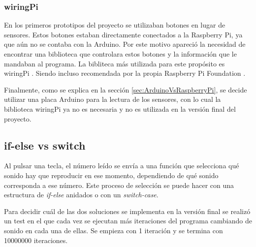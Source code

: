             \subsubsection{wiringPi} %
            \label{ssub:WiringPi}

                En los primeros prototipos del proyecto se utilizaban botones en lugar de sensores. Estos botones
                estaban directamente conectados a la Raspberry Pi, ya que aún no se contaba con la Arduino. Por este
                motivo apareció la necesidad de encontrar una biblioteca que controlara estos botones y la información
                que le mandaban al programa. La bibliteca más utilizada para este propósito es wiringPi \cite{wiringPi}.
                Siendo incluso recomendada por la propia Raspberry Pi Foundation \cite{wiringpi_raspberrypi_docu}.

                Finalmente, como se explica en la sección \ref{sec:ArduinoVsRaspberryPi}, se decide utilizar una placa
                Arduino para la lectura de los sensores, con lo cual la biblioteca wiringPi ya no es necesaria y no es
                utilizada en la versión final del proyecto.



        \subsection{if-else vs switch} %
        \label{sub:if-else_vs_switch}

            Al pulsar una tecla, el número leído se envía a una función que selecciona qué sonido hay que reproducir en
            ese momento, dependiendo de qué sonido corresponda a ese número. Este proceso de selección se puede hacer
            con una estructura de \textit{if-else} anidados o con un \textit{switch-case}.

            Para decidir cuál de las dos soluciones se implementa en la versión final se realizó un test en el que cada
            vez se ejecutan más iteraciones del programa cambiando de sonido en cada una de ellas. Se empieza con 1
            iteración y se termina con 10000000 iteraciones.

